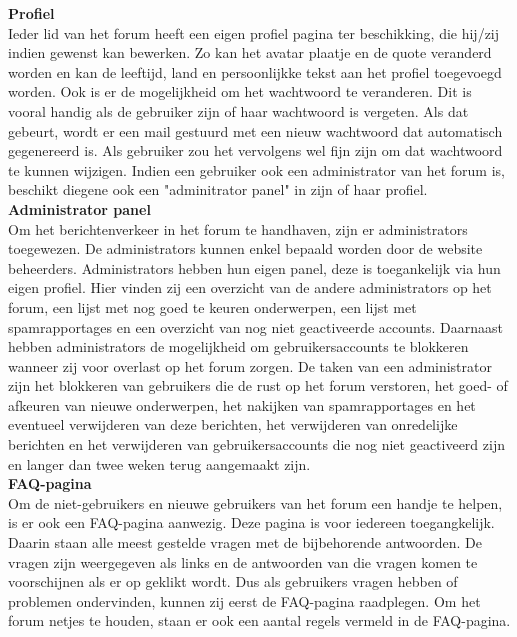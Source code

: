 \documentclass[a4paper,12pt]{article}
\begin{document}
 
{\bfseries Profiel}\\
Ieder lid van het forum heeft een eigen profiel pagina ter beschikking, die hij/zij indien gewenst kan bewerken. Zo kan het avatar plaatje en de quote veranderd worden en kan de leeftijd, land en persoonlijkke tekst aan het profiel toegevoegd worden. Ook is er de mogelijkheid om het wachtwoord te veranderen. Dit is vooral handig als de gebruiker zijn of haar wachtwoord is vergeten. Als dat gebeurt, wordt er een mail gestuurd met een nieuw wachtwoord dat automatisch gegenereerd is. Als gebruiker zou het vervolgens wel fijn zijn om dat wachtwoord te kunnen wijzigen. Indien een gebruiker ook een administrator van het forum is, beschikt diegene ook een "adminitrator panel" in zijn of haar profiel. \\


{\bfseries Administrator panel}\\
Om het berichtenverkeer in het forum te handhaven, zijn er administrators toegewezen. De administrators kunnen enkel bepaald worden door de website beheerders. Administrators hebben hun eigen panel, deze is toegankelijk via hun eigen profiel. Hier vinden zij een overzicht van de andere administrators op het forum, een lijst met nog goed te keuren onderwerpen, een lijst met spamrapportages en een overzicht van nog niet geactiveerde accounts. Daarnaast hebben administrators de mogelijkheid om gebruikersaccounts te blokkeren wanneer zij voor overlast op het forum zorgen. De taken van een administrator zijn het blokkeren van gebruikers die de rust op het forum verstoren, het goed- of afkeuren van nieuwe onderwerpen, het nakijken van spamrapportages en het eventueel verwijderen van deze berichten, het verwijderen van onredelijke berichten en het verwijderen van gebruikersaccounts die nog niet geactiveerd zijn en langer dan twee weken terug aangemaakt zijn. \\


{\bfseries FAQ-pagina}\\
Om de niet-gebruikers en nieuwe gebruikers van het forum een handje te helpen, is er ook een FAQ-pagina aanwezig. Deze pagina is voor iedereen toegangkelijk. Daarin staan alle meest gestelde vragen met de bijbehorende antwoorden. De vragen zijn weergegeven als links en de antwoorden van die vragen komen te voorschijnen als er op geklikt wordt. Dus als gebruikers vragen hebben of problemen ondervinden, kunnen zij eerst de FAQ-pagina raadplegen. Om het forum netjes te houden, staan er ook een aantal regels vermeld in de FAQ-pagina.
\end{document}

